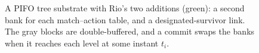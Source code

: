 \begin{figure}[t]
\begin{tikzpicture}
\end{tikzpicture}
\caption{A PIFO tree substrate with Rio's two additions (green): a second bank for each match--action table, and a designated-survivor link. The gray blocks are double-buffered, and a commit swaps the banks when it reaches each level at some instant $t_i$.}
\label{fig:hardware}
\end{figure}
